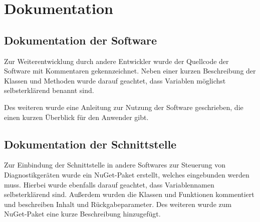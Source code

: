 \section{Dokumentation}
\label{sec:Dokumentation}

\subsection{Dokumentation der Software}
\label{sec:DokumentationSoftware}
Zur Weiterentwicklung durch andere Entwickler wurde der Quellcode der Software mit Kommentaren gekennzeichnet. Neben einer kurzen Beschreibung der Klassen und Methoden wurde darauf geachtet, dass Variablen möglichst selbsterklärend benannt sind.

Des weiteren wurde eine Anleitung zur Nutzung der Software geschrieben, die einen kurzen Überblick für den Anwender gibt.

\subsection{Dokumentation der Schnittstelle}
\label{sec:DokumentationSchnittstelle}
Zur Einbindung der Schnittstelle in andere Softwares zur Steuerung von Diagnostikgeräten wurde ein {\acs{NuGet}}-Paket erstellt, welches eingebunden werden muss. Hierbei wurde ebenfalls darauf geachtet, dass Variablennamen selbsterklärend sind. Außerdem wurden die Klassen und Funktionen kommentiert und beschreiben Inhalt und Rückgabeparameter. Des weiteren wurde zum {\acs{NuGet}}-Paket eine kurze Beschreibung hinzugefügt.